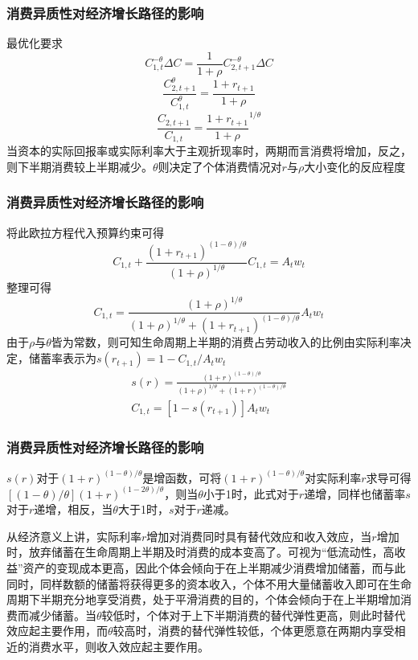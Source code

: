 \documentclass{beamer}
\begin{document}
\begin{frame}
\frametitle{消费异质性对经济增长路径的影响}
最优化要求
\begin{equation*}
C_{1,t}^{-\theta}\Delta C=\frac{1}{1+\rho}C_{2,t+1}^{-\theta}\Delta C
\end{equation*}
\begin{equation*}
\frac{C_{2,t+1}^\theta}{C_{1,t}^\theta}=\frac{1+r_{t+1}}{1+\rho}
\end{equation*}
\begin{equation*}
\frac{C_{2,t+1}}{C_{1,t}}=\frac{1+r_{t+1}}{1+\rho}^{1/\theta}
\end{equation*}
当资本的实际回报率或实际利率大于主观折现率时，两期而言消费将增加，反之，则下半期消费较上半期减少。$\theta$则决定了个体消费情况对$r$与$\rho$大小变化的反应程度
\end{frame}

\begin{frame}
\frametitle{消费异质性对经济增长路径的影响}
将此欧拉方程代入预算约束可得
\begin{equation*}
C_{1,t}+\frac{(1+r_{t+1})^{(1-\theta)/\theta}}{(1+\rho)^{1/\theta}}C_{1,t}=A_tw_t
\end{equation*}
整理可得
\begin{equation*}
C_{1,t}=\frac{(1+\rho)^{1/\theta}}{(1+\rho)^{1/\theta}+(1+r_{t+1})^{(1-\theta)/\theta}}A_tw_t
\end{equation*}
由于$\rho$与$\theta$皆为常数，则可知生命周期上半期的消费占劳动收入的比例由实际利率决定，储蓄率表示为$s(r_{t+1})=1-C_{1,t}/A_tw_t$
\begin{align*}
s(r)=\frac{(1+r)^{(1-\theta)/\theta}}{(1+\rho)^{1/\theta}+(1+r)^{(1-\theta)/\theta}}\\
C_{1,t}=[1-s(r_{t+1})]A_tw_t
\end{align*}
\end{frame}

\begin{frame}
\frametitle{消费异质性对经济增长路径的影响}   
$s(r)$对于$(1+r)^{(1-\theta)/\theta}$是增函数，可将$(1+r)^{(1-\theta)/\theta}$对实际利率$r$求导可得$[(1-\theta)/\theta](1+r)^{(1-2\theta)/\theta}$，则当$\theta$小于1时，此式对于$r$递增，同样也储蓄率$s$对于$r$递增，相反，当$\theta$大于1时，$s$对于$r$递减。

\vspace{12 pt}

从经济意义上讲，实际利率$r$增加对消费同时具有替代效应和收入效应，当$r$增加时，放弃储蓄在生命周期上半期及时消费的成本变高了。可视为“低流动性，高收益”资产的变现成本更高，因此个体会倾向于在上半期减少消费增加储蓄，而与此同时，同样数额的储蓄将获得更多的资本收入，个体不用大量储蓄收入即可在生命周期下半期充分地享受消费，处于平滑消费的目的，个体会倾向于在上半期增加消费而减少储蓄。当$\theta$较低时，个体对于上下半期消费的替代弹性更高，则此时替代效应起主要作用，而$\theta$较高时，消费的替代弹性较低，个体更愿意在两期内享受相近的消费水平，则收入效应起主要作用。
\end{frame}
\end{document}
